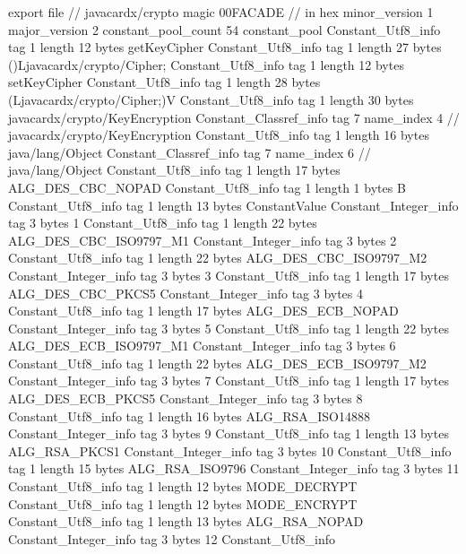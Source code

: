 export file {		// javacardx/crypto
	magic	00FACADE		 // in hex
	minor_version	1
	major_version	2
	constant_pool_count	54
	constant_pool {
		Constant_Utf8_info {
			tag	1
			length	12
			bytes	getKeyCipher
		}
		Constant_Utf8_info {
			tag	1
			length	27
			bytes	()Ljavacardx/crypto/Cipher;
		}
		Constant_Utf8_info {
			tag	1
			length	12
			bytes	setKeyCipher
		}
		Constant_Utf8_info {
			tag	1
			length	28
			bytes	(Ljavacardx/crypto/Cipher;)V
		}
		Constant_Utf8_info {
			tag	1
			length	30
			bytes	javacardx/crypto/KeyEncryption
		}
		Constant_Classref_info {
			tag	7
			name_index	4		// javacardx/crypto/KeyEncryption
		}
		Constant_Utf8_info {
			tag	1
			length	16
			bytes	java/lang/Object
		}
		Constant_Classref_info {
			tag	7
			name_index	6		// java/lang/Object
		}
		Constant_Utf8_info {
			tag	1
			length	17
			bytes	ALG_DES_CBC_NOPAD
		}
		Constant_Utf8_info {
			tag	1
			length	1
			bytes	B
		}
		Constant_Utf8_info {
			tag	1
			length	13
			bytes	ConstantValue
		}
		Constant_Integer_info {
			tag	3
			bytes	1
		}
		Constant_Utf8_info {
			tag	1
			length	22
			bytes	ALG_DES_CBC_ISO9797_M1
		}
		Constant_Integer_info {
			tag	3
			bytes	2
		}
		Constant_Utf8_info {
			tag	1
			length	22
			bytes	ALG_DES_CBC_ISO9797_M2
		}
		Constant_Integer_info {
			tag	3
			bytes	3
		}
		Constant_Utf8_info {
			tag	1
			length	17
			bytes	ALG_DES_CBC_PKCS5
		}
		Constant_Integer_info {
			tag	3
			bytes	4
		}
		Constant_Utf8_info {
			tag	1
			length	17
			bytes	ALG_DES_ECB_NOPAD
		}
		Constant_Integer_info {
			tag	3
			bytes	5
		}
		Constant_Utf8_info {
			tag	1
			length	22
			bytes	ALG_DES_ECB_ISO9797_M1
		}
		Constant_Integer_info {
			tag	3
			bytes	6
		}
		Constant_Utf8_info {
			tag	1
			length	22
			bytes	ALG_DES_ECB_ISO9797_M2
		}
		Constant_Integer_info {
			tag	3
			bytes	7
		}
		Constant_Utf8_info {
			tag	1
			length	17
			bytes	ALG_DES_ECB_PKCS5
		}
		Constant_Integer_info {
			tag	3
			bytes	8
		}
		Constant_Utf8_info {
			tag	1
			length	16
			bytes	ALG_RSA_ISO14888
		}
		Constant_Integer_info {
			tag	3
			bytes	9
		}
		Constant_Utf8_info {
			tag	1
			length	13
			bytes	ALG_RSA_PKCS1
		}
		Constant_Integer_info {
			tag	3
			bytes	10
		}
		Constant_Utf8_info {
			tag	1
			length	15
			bytes	ALG_RSA_ISO9796
		}
		Constant_Integer_info {
			tag	3
			bytes	11
		}
		Constant_Utf8_info {
			tag	1
			length	12
			bytes	MODE_DECRYPT
		}
		Constant_Utf8_info {
			tag	1
			length	12
			bytes	MODE_ENCRYPT
		}
		Constant_Utf8_info {
			tag	1
			length	13
			bytes	ALG_RSA_NOPAD
		}
		Constant_Integer_info {
			tag	3
			bytes	12
		}
		Constant_Utf8_info {
}}}
